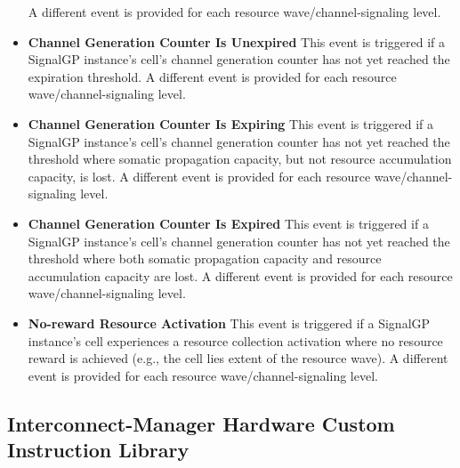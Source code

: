 \begin{itemize}
A different event is provided for each resource wave/channel-signaling level.
\item \textbf{Channel Generation Counter Is Unexpired}
This event is triggered if a SignalGP instance's cell's channel generation counter has not yet reached the expiration threshold.
A different event is provided for each resource wave/channel-signaling level.
\item \textbf{Channel Generation Counter Is Expiring}
This event is triggered if a SignalGP instance's cell's channel generation counter has not yet reached the threshold where somatic propagation capacity, but not resource accumulation capacity, is lost.
A different event is provided for each resource wave/channel-signaling level.
\item \textbf{Channel Generation Counter Is Expired}
This event is triggered if a SignalGP instance's cell's channel generation counter has not yet reached the threshold where both somatic propagation capacity and resource accumulation capacity are lost.
A different event is provided for each resource wave/channel-signaling level.
\item \textbf{No-reward Resource Activation}
This event is triggered if a SignalGP instance's cell experiences a resource collection activation where no resource reward is achieved (e.g., the cell lies extent of the resource wave).
A different event is provided for each resource wave/channel-signaling level.
\end{itemize}

\subsection{Interconnect-Manager Hardware Custom Instruction Library}

